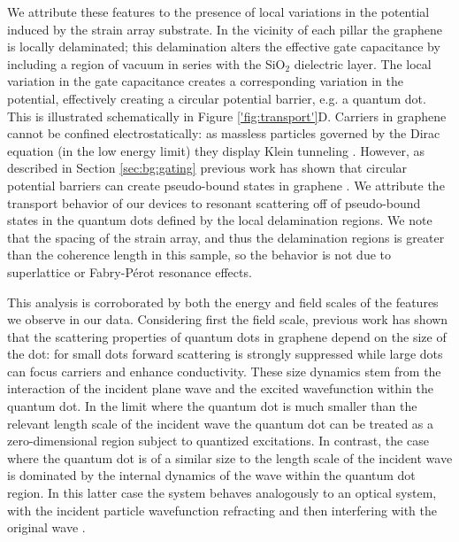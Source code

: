 \documentclass[edeposit,fullpage,draftthesis]{uiucthesis2009}
\begin{document}
            We attribute these features to the presence of local variations in the potential induced by the strain array substrate.
            In the vicinity of each pillar the graphene is locally delaminated; this delamination alters the 
            effective gate capacitance by including a region of vacuum in series with the SiO$_2$ dielectric layer.
            The local variation in the gate capacitance creates a corresponding variation in the potential,
            effectively creating a circular potential barrier, e.g. a quantum dot. This is illustrated schematically
            in Figure \ref{'fig:transport'}D.
            Carriers in graphene cannot be confined electrostatically: as massless particles governed by the Dirac equation
            (in the low energy limit)
            they display Klein tunneling \cite{katsnelson2006chiral,young2009quantum}.
            However, as described in Section \ref{sec:bg:gating}
            previous work has shown that circular potential barriers can create pseudo-bound states in 
            graphene \cite{silvestrov2007quantum,matulis2008quasibound,hewageegana2008electron,chen2007fock, heinisch2013mie}.
            We attribute the transport behavior of our devices to resonant scattering off of pseudo-bound
            states in the quantum dots defined by the local delamination regions.
            We note that the spacing of the strain array, and thus the delamination regions is greater than the coherence length
            in this sample, so the behavior is not due to superlattice or Fabry-P\'erot resonance effects.
            
            This analysis is corroborated by both the energy and field scales of the features we observe in our data. 
            Considering first the field scale,
            previous work \cite{heinisch2013mie} has shown that the scattering properties of
            quantum dots in graphene depend on the size of the dot:
            for small dots forward scattering is strongly suppressed while large dots can focus
            carriers and enhance conductivity. These size dynamics stem from the interaction of the incident
            plane wave and the excited wavefunction within the quantum dot. In the limit where the quantum dot
            is much smaller than the relevant length scale of the incident wave the quantum dot can be treated
            as a zero-dimensional region subject to quantized excitations. 
            In contrast, the case where the quantum dot is of a similar
            size to the length scale of the incident wave is dominated by the internal dynamics of the wave within
            the quantum dot region. In this latter case the system behaves analogously to an optical system,
            with the incident particle wavefunction refracting and then interfering with the original wave
            \cite{cserti2007caustics}.
            
\end{document}
